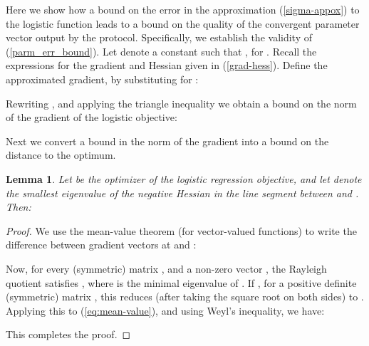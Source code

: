 \documentclass[11pt]{article}
\newtheorem{lem}[thm]{Lemma}
\begin{document}
Here we show how a bound on the error in the approximation (\ref{sigma-appox}) to the logistic function leads to a bound on the quality of the convergent parameter vector output by the protocol. Specifically, we establish the validity of (\ref{parm_err_bound}). Let  denote a constant such that , for . Recall the expressions for the gradient  and Hessian  given in (\ref{grad-hess}). Define the approximated gradient, by substituting  for :

Rewriting ,
and applying the triangle inequality we obtain a bound on the norm of the gradient of the logistic objective:

Next we  convert a bound in the norm of the gradient into a bound on the distance to the optimum.  











\begin{lem}\label{lem_meanval}
Let  be the optimizer of the logistic regression objective, and let  denote the smallest eigenvalue of the negative Hessian in the line segment between  and . Then:

\end{lem}

\begin{proof}
We  use the mean-value theorem (for vector-valued functions) to write the difference between gradient vectors at  and :

Now, for every (symmetric) matrix , and a non-zero vector , the Rayleigh quotient satisfies , where  is the minimal eigenvalue of . If , for a positive definite (symmetric) matrix , this reduces (after taking the square root on both sides) to .  Applying this to (\ref{eq:mean-value}), and using Weyl's inequality, we have:

This completes the proof.
\end{proof}
\end{document}
